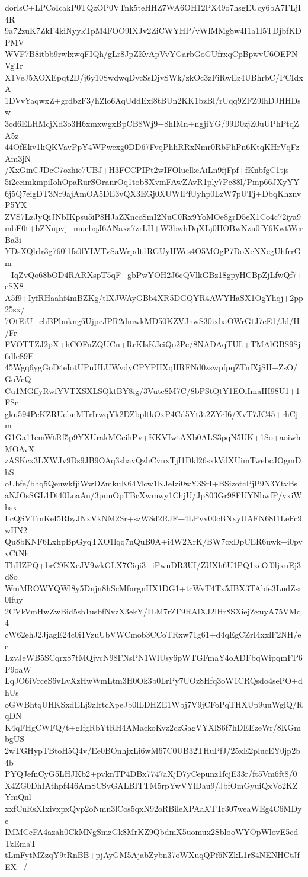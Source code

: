 dorlsC+LPCoIcakP0TQzOP0VTnk5teHHZ7WA6OH12PX49o7hsgEUcy6bA7FLjI4R
9a72zuK7ZkF4kiNyykTpM4FOO9IXJv2ZiCWYHP/vWlMMg8w4I1a1I5TDjbfKDPMV
WVF7B8itbb9rwlxwqFIQh/gLr8JpZKvApVvYGarbGoGUfrxqCpBpwvU6OEPNVgTr
X1VeJ5XOXEpqt2D/j6y10SwdwqDvcSsDjvSWk/zkOc3zFiRwEz4UBhrbC/PCIdxA
1DVvYaqwxZ+grdbzF3/hZlo6AqUddExi8tBUn2KK1bzBl/rUqq9ZFZ9lhDJHHDsw
3cd6ELHMcjXd3o3H6xmxwgxBpCB8Wj9+8hIMn+ngjiYG/99D0zjZ0uUPhPtqZA5z
44OfEkv1kQKVavPpY4WPwexg0DD67FvqPhhRRxNmr0RbFhPn6KtqKHrVqFzAm3jN
/XxGinCJDcC7ozhie7UBJ+H3FCCPIPt2wIFOluelkeAiLn9fjFpf+fKnbfgC1tjs
5i2ccimkmpiIohOpaRurSOranrOq1tobSXvmFAwZAvR1ply7Pc88l/Pmp66JXyYY
6j5Q7eigDT3Nr9ajAmOA5DE3vQX3EGj0XUWlPfUyhp0LzW7pUTj+DbqKhznvP5YX
ZVS7LzJyQiJNbIKpsu5iP8HJaZXnccSmI2NuC0Rx9YoMOe8grD5eX1Co4c72iya9
mbF0t+bZNupvj+mucbqJ6ANaxa7zrLH+W3bwhDqXLj0HOBwNzu0fY6KwtWcrBa3i
YDsXQlrlr3g760l1fs0fYLVTvSaWrpdt1RGUyHWes4O5MOgP7DoXeNXegUhfrrGm
+IqZvQo68bOD4RARXspT5qF+gbPwYOH2J6cQVlkGBz18gpyHCBpZjLfwQf7+eSX8
A5f9+IyfRHaahf4mBZKg/tlXJWAyGBb4XR5DGQYR4AWYHaSX1OgYhqj+2pp25sx/
7OtEiU+chBPbnkng6UjpcJPR2dmwkMD50KZVJnwS30ixhaOWrGtJ7eE1/Jd/H/Fr
FVOTTZJ2pX+hCOFnZQUCn+RrKIsKJciQo2Pe/8NADAqTUL+TMAlGBS9Sj6dle89E
45Wgq6ygGoD4eIotUPnULUWvdyCPYPHXqHRFNd0zswpfpqZTnfXjSH+ZsO/GoVcQ
Cu1MGffyRwfYVTXSXLSQktBY8ig/3Vute8M7C/8bPStQtY1EOiImaIH98U1+1FSc
gku594PeKZRUebnMTrIrwqYk2DZbpltkOxP4Cd5Yt3t2ZYcI6/XvT7JC45+rhCjm
G1Ga11cmWtRf5p9YXUrakMCcihPv+KKVIwtAXb0ALS3pqN5UK+1So+aoiwhMOAvX
zASKcx3LXWJv9Ds9JB9OAq3shavQzhCvnxTjI1Dkl26sxkVdXUimTwebcJOgmDhS
oUbfe/bhq5QeuwkfjiWwDZmkuK64Mcw1KJeIzi0wY3SrI+BSizotcPjP9N3YtvBs
aNJOsSGL1Di40LoaAu/3punOpTBcXwmwy1ChjU/Jp803Gr98FUYNbwfP/yxiWhsx
LcQSVTmKeI5RbyJNxVkNM2Sr+szW8d2RJF+4LPvv00cBNxyUAFN68I1LeFc9wHN2
Qu8bKNF6LxhpBpGyqTXO1lqq7nQuB0A+i4W2XrK/BW7cxDpCER6uwk+i0pvvCtNh
ThHZPQ+brC9KXeJV9wkGLX7Ciqi3+iPwnDR3UI/ZUXh6U1PQ1xcOf0ljxuEj3d8o
WmMROWYQWl8y5Dnjn8hScMfnrgnHX1DG1+tcWvT4Tx5JBX3TAbfe3LudZsr0lfuy
2CVkVmHwZwBid5sb1usbfNvzX3ekY/ILM7rZF9RAlXJ2lHr8SXiejZxuyA75VMq4
cW62ehJ2JjagE24c0i1VzuUbVWCmob3CCoTRxw71g61+d4qEgCZrI4xxlF2NH/ec
LzvJeWB5SCqrx87tMQjvcN98FNsPN1WlUsy6pWTGFmaY4oADFbqWipqmFP6P9oaW
LqJO6iVrceS6vLvXzHwWmLtm3H0Ok3b0LrPy7UOz8Hfq3oW1CRQsdo4sePO+dhUs
oGWBhtqUHKSxdELj9zIrtcXpeJb0lLDHZE1Wbj7V9jCFoPqTHXUp9uuWglQ/RqDN
K4qFHgCWFQ/t+gIfgRbYtRH4AMackoKvz2czGagVYXlS6f7hDEEzeWr/8KGmbgUS
2wTGHypTBtoH5Q4v/Ee0BOnhjxLi6wM67C0UB32THuPfJ/25xE2plucEY0jp2b4b
PYQJefnCyG5LHJKb2+pvknTP4DBx7747aXjD7yCepunz1fcjE33r/ft5Vm6ft8/0
X4ZG0DhIAthpf446AmSCSvGALBITTM5rpYwVYlDau9/JbfOmGyuiQxVo2KZYmQnl
xxfCuRsXIxivxpxQvp2oNmn3lCos5qxN92oRBileXPAaXTTr307weaWEg4C6MDye
IMMCcFA4azah0CkMNgSmzGk8MrKZ9QbdmX5uomux2SblooWYOpWlovE5cdTzEmaT
tLmFytMZzqY9tRnBB+pjAyGM5AjabZybn37oWXuqQPf6NZkL1rS4NENHCtJfEX+/
